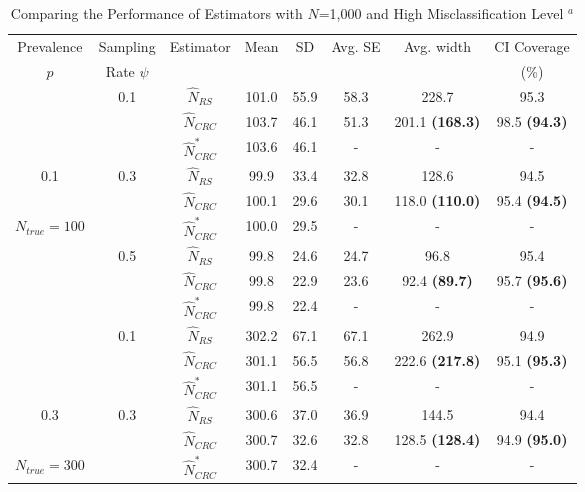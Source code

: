 \documentclass[useAMS,usenatbib,referee]{biom}
\begin{document}
\begin{table}
    \centering
    \caption{Comparing the Performance of Estimators with $N$=1,000 and High Misclassification Level $^a$  }
    \label{table_4}
    \begin{threeparttable}[b]
    \begin{tabular}{|c|c|c|c|c|c|c|c|}
    \hline
    Prevalence & 
    Sampling &  \multirow{2}{*}{Estimator \tnote{b}} & \multirow{2}{*}{Mean} & \multirow{2}{*}{SD} & \multirow{2}{*}{Avg. SE} & \multirow{2}{*}{Avg. width \tnote{c}} & CI Coverage  \\
    $p$ & Rate $\psi$ & &&&&& (\%)  \\ \hline
     & \multirow{3}{*}{0.1} & $\hat{N}_{RS}$ & 101.0 & 55.9 & 58.3 & 228.7 & 95.3   \\ \cline{3-8}
     & ~ & $\hat{N}_{CRC}$ & 103.7 & 46.1 & 51.3 & 201.1 \textbf{(168.3)} & 98.5 \textbf{(94.3)}  \\ \cline{3-8}
     & ~ & $\hat{N}_{CRC}^*$ & 103.6 & 46.1  & - & - & -   \\ \cline{2-8}
    
    0.1 & \multirow{3}{*}{0.3}  & $\hat{N}_{RS}$ & 99.9 & 33.4 & 32.8 & 128.6 & 94.5    \\ \cline{3-8}
     & ~ & $\hat{N}_{CRC}$ & 100.1 & 29.6 & 30.1 & 118.0 \textbf{(110.0)} & 95.4 \textbf{(94.5)}  \\ \cline{3-8}
    $N_{true}=100$ & ~ & $\hat{N}_{CRC}^*$ & 100.0 & 29.5 & - & - & -   \\  \cline{2-8}
    
     & \multirow{3}{*}{0.5}  & $\hat{N}_{RS}$ & 99.8 & 24.6 & 24.7 & 96.8 & 95.4   \\ \cline{3-8}
     & ~ & $\hat{N}_{CRC}$ & 99.8 & 22.9 & 23.6 & 92.4 \textbf{(89.7)} & 95.7 \textbf{(95.6)}   \\ \cline{3-8}
    ~ & ~ & $\hat{N}_{CRC}^*$ & 99.8 & 22.4 & - & - & -   \\ \hline
    
    & \multirow{3}{*}{0.1} & $\hat{N}_{RS}$ & 302.2 & 67.1 & 67.1 & 262.9 & 94.9  \\ \cline{3-8}
     & ~ & $\hat{N}_{CRC}$ &   301.1 & 56.5 & 56.8 & 222.6 \textbf{(217.8)} & 95.1 \textbf{(95.3)}  \\ \cline{3-8}
    ~ & ~ & $\hat{N}_{CRC}^*$ & 301.1 & 56.5 & - & - & -   \\ \cline{2-8}
    
    0.3 & \multirow{3}{*}{0.3}  & $\hat{N}_{RS}$ & 300.6 & 37.0 & 36.9 & 144.5 & 94.4  \\ \cline{3-8}
     & ~ & $\hat{N}_{CRC}$ &  300.7 & 32.6 & 32.8 & 128.5 \textbf{(128.4)} & 94.9 \textbf{(95.0)}   \\ \cline{3-8}
     $N_{true}=300$ & ~ & $\hat{N}_{CRC}^*$ &  300.7 & 32.4 & - & - & -   \\ \cline{2-8}
    

\end{tabular}
\end{threeparttable}
\end{table}
\end{document}
